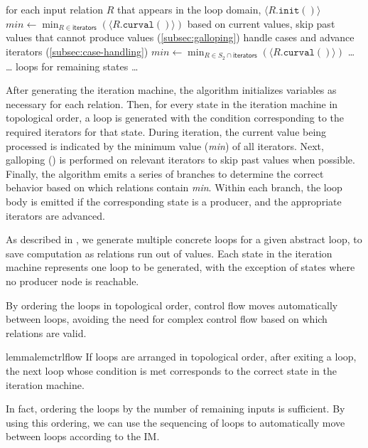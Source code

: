\documentclass[acmsmall,screen,nonacm]{acmart}\settopmatter{printfolios=true,printccs=false,printacmref=false}
\begin{document}
\begin{algorithmic}\footnotesize
    \State for each input relation $R$ that appears in the loop domain, $\langle R.\texttt{init}() \rangle$
        \State $\textit{min} \gets \min_{R \in \textsf{iterators}}(\langle R.\texttt{curval}() \rangle)$
        \State based on current values, skip past values that cannot produce values (\ref{subsec:galloping})
        \State handle cases and advance iterators (\ref{subsec:case-handling})
    \EndWhile
        \State $\textit{min} \gets \min_{R \in S_2 \cap \textsf{iterators}}(\langle R.\texttt{curval}() \rangle)$
        \State \dots
    \EndWhile
    \State \dots{} loops for remaining states \dots
\end{algorithmic}

After generating the iteration machine, the algorithm initializes variables as necessary for each relation. Then, for every state in the iteration machine in topological order, a loop is generated with the condition corresponding to the required iterators for that state. During iteration, the current value being processed is indicated by the minimum value (\textit{min}) of all iterators. Next, galloping () is performed on relevant iterators to skip past values when possible. Finally, the algorithm emits a series of branches to determine the correct behavior based on which relations contain \textit{min}. Within each branch, the loop body is emitted if the corresponding state is a producer, and the appropriate iterators are advanced.

As described in , we generate multiple concrete loops for a given abstract loop, to save computation as relations run out of values. Each state in the iteration machine represents one loop to be generated, with the exception of states where no producer node is reachable.

By ordering the loops in topological order, control flow moves automatically between loops, avoiding the need for complex control flow based on which relations are valid.
\begin{restatable}{lemma}{lemctrlflow}
    If loops are arranged in topological order, after exiting a loop, the next loop whose condition is met corresponds to the correct state in the iteration machine.
\end{restatable}
In fact, ordering the loops by the number of remaining inputs is sufficient. By using this ordering, we can use the sequencing of loops to automatically move between loops according to the IM.
\end{document}
